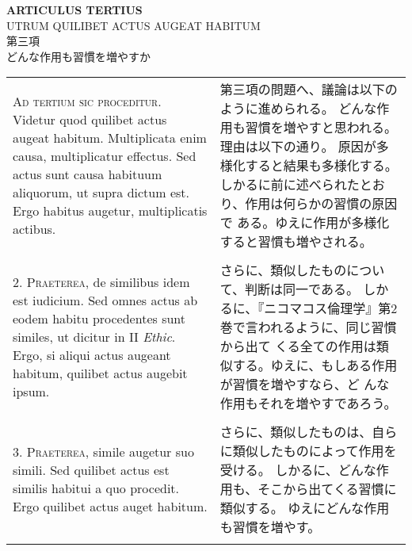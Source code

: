 \documentclass[10pt]{jsarticle} %
\begin{document}
\begin{center}
{\Large {\bf ARTICULUS TERTIUS}}\\
{\large UTRUM QUILIBET ACTUS AUGEAT HABITUM}\\
{\Large 第三項\\どんな作用も習慣を増やすか}
\end{center}

\begin{longtable}{p{21em}p{21em}}

{\scshape Ad tertium sic proceditur}. Videtur quod quilibet actus augeat
habitum. Multiplicata enim causa, multiplicatur effectus. Sed actus
sunt causa habituum aliquorum, ut supra dictum est. Ergo habitus
augetur, multiplicatis actibus.

&

第三項の問題へ、議論は以下のように進められる。
どんな作用も習慣を増やすと思われる。理由は以下の通り。
原因が多様化すると結果も多様化する。しかるに前に述べられたとおり、作用は何らかの習慣の原因で
 ある。ゆえに作用が多様化すると習慣も増やされる。

\\\\



2. {\scshape Praeterea}, de similibus idem est iudicium. Sed omnes actus ab eodem
habitu procedentes sunt similes, ut dicitur in II {\itshape Ethic}. Ergo, si
aliqui actus augeant habitum, quilibet actus augebit ipsum.

&

さらに、類似したものについて、判断は同一である。
しかるに、『ニコマコス倫理学』第2巻で言われるように、同じ習慣から出て
 くる全ての作用は類似する。ゆえに、もしある作用が習慣を増やすなら、ど
 んな作用もそれを増やすであろう。

\\\\



3. {\scshape Praeterea}, simile augetur suo simili. Sed quilibet actus est similis
habitui a quo procedit. Ergo quilibet actus auget habitum.

&

さらに、類似したものは、自らに類似したものによって作用を受ける。
しかるに、どんな作用も、そこから出てくる習慣に類似する。
ゆえにどんな作用も習慣を増やす。

\\\\




\end{longtable}
\end{document}
